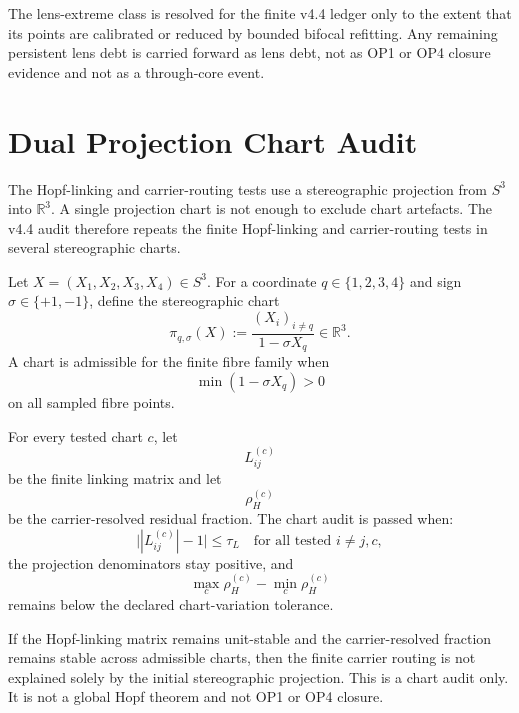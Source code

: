 \begin{theorem}
The lens-extreme class is resolved for the finite v4.4 ledger only to the
extent that its points are calibrated or reduced by bounded bifocal refitting.
Any remaining persistent lens debt is carried forward as lens debt, not as OP1
or OP4 closure evidence and not as a through-core event.
\end{theorem}



\section{Dual Projection Chart Audit}
\label{sec:dual-projection-chart-audit}

The Hopf-linking and carrier-routing tests use a stereographic projection from
\(S^3\) into \(\mathbb R^3\).  A single projection chart is not enough to
exclude chart artefacts.  The v4.4 audit therefore repeats the finite
Hopf-linking and carrier-routing tests in several stereographic charts.

\begin{definition}
Let \(X=(X_1,X_2,X_3,X_4)\in S^3\).  For a coordinate \(q\in\{1,2,3,4\}\)
and sign \(\sigma\in\{+1,-1\}\), define the stereographic chart
\[
    \pi_{q,\sigma}(X)
    :=
    \frac{(X_i)_{i\neq q}}{1-\sigma X_q}
    \in\mathbb R^3.
\]
A chart is admissible for the finite fibre family when
\[
    \min(1-\sigma X_q)>0
\]
on all sampled fibre points.
\end{definition}

\begin{definition}
For every tested chart \(c\), let
\[
    L_{ij}^{(c)}
\]
be the finite linking matrix and let
\[
    \rho_H^{(c)}
\]
be the carrier-resolved residual fraction.  The chart audit is passed when:
\[
    \bigl||L_{ij}^{(c)}|-1\bigr|\leq\tau_L
    \quad\text{for all tested }i\neq j,c,
\]
the projection denominators stay positive, and
\[
    \max_c\rho_H^{(c)}-\min_c\rho_H^{(c)}
\]
remains below the declared chart-variation tolerance.
\end{definition}

\begin{proposition}
If the Hopf-linking matrix remains unit-stable and the carrier-resolved
fraction remains stable across admissible charts, then the finite carrier
routing is not explained solely by the initial stereographic projection.  This
is a chart audit only.  It is not a global Hopf theorem and not OP1 or OP4
closure.
\end{proposition}

